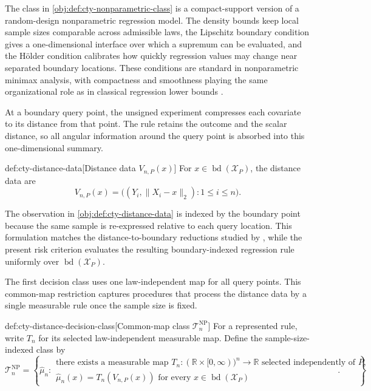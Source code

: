 \documentclass[11pt]{article}
\begin{document}
The class in \cref{obj:def:cty-nonparametric-class} is a compact-support version of a random-design nonparametric regression model. The density bounds keep local sample sizes comparable across admissible laws, the Lipschitz boundary condition gives a one-dimensional interface over which a supremum can be evaluated, and the Hölder condition calibrates how quickly regression values may change near separated boundary locations. These conditions are standard in nonparametric minimax analysis, with compactness and smoothness playing the same organizational role as in classical regression lower bounds \citep{Stone1982,Tsybakov2009}.

At a boundary query point, the unsigned experiment compresses each covariate to its distance from that point. The rule retains the outcome and the scalar distance, so all angular information around the query point is absorbed into this one-dimensional summary.

\begin{definitionv}{def:cty-distance-data}[Distance data $V_{n,P}(x)$]
For \(x\in\operatorname{bd}(\mathcal X_P)\), the distance data are
\[
V_{n,P}(x)
=
\bigl((Y_i,\lVert X_i-x\rVert_2):1\leq i\leq n\bigr).
\]
\end{definitionv}

The observation in \cref{obj:def:cty-distance-data} is indexed by the boundary point because the same sample is re-expressed relative to each query location. This formulation matches the distance-to-boundary reductions studied by \citet{CattaneoTitiunikYu2026Distance}, while the present risk criterion evaluates the resulting boundary-indexed regression rule uniformly over \(\operatorname{bd}(\mathcal X_P)\).

The first decision class uses one law-independent map for all query points. This common-map restriction captures procedures that process the distance data by a single measurable rule once the sample size is fixed.

\begin{definitionv}{def:cty-distance-decision-class}[Common-map class $\mathcal T_n^{\mathrm{NP}}$]
For a represented rule, write \(T_n\) for its selected law-independent measurable map. Define the sample-size-indexed class by
\[
\mathcal T_n^{\mathrm{NP}}
=
\left\{
\widehat\mu_n:
\begin{array}{l}
\text{there exists a measurable map }T_n:(\mathbb R\times[0,\infty))^n\to\mathbb R
\text{ selected independently of }P,\\
\widehat\mu_n(x)=T_n(V_{n,P}(x))
\text{ for every }x\in\operatorname{bd}(\mathcal X_P)
\end{array}
\right\}.
\]
\end{definitionv}
\end{document}
